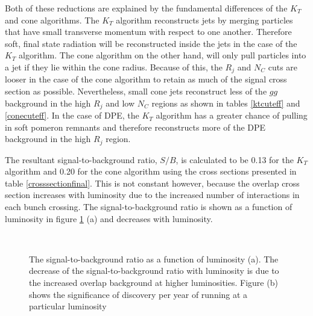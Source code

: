 Both of these reductions are explained by the fundamental differences of the $K_T$ and cone algorithms. The $K_T$ algorithm reconstructs jets by merging particles that have small transverse momentum with respect to one another. Therefore soft, final state radiation will be reconstructed inside the jets in the case of the $K_T$ algorithm. The cone algorithm on the other hand, will only pull particles into a jet if they lie within the cone radius. Because of this, the $R_j$ and $N_C$ cuts are looser in the case of the cone algorithm to retain as much of the signal cross section as possible. Nevertheless, small cone jets reconstruct less of the $gg$ background in the high $R_{j}$ and low $N_C$ regions as shown in tables \ref{ktcuteff} and \ref{conecuteff}. In the case of DPE, the $K_T$ algorithm has a greater chance of pulling in soft pomeron remnants and therefore reconstructs more of the DPE background in the high $R_j$ region.

The resultant signal-to-background ratio, $S/B$, is calculated to be 0.13 for the $K_T$ algorithm and 0.20 for the cone algorithm using the cross sections presented in table \ref{crosssectionfinal}. This is not constant however, because the overlap cross section increases with luminosity due to the increased number of interactions in each bunch crossing. The signal-to-background ratio is shown as a function of luminosity in figure \ref{StoBvsLumi} (a) and decreases with luminosity. 

\begin{figure}
\centering
\mbox{
	\quad
	}
\caption[The signal-to-background ratio and significance of the Standard Model Higgs boson as a function of luminosity]{The signal-to-background ratio as a function of luminosity (a). The decrease of the signal-to-background ratio with luminosity is due to the increased overlap background at higher luminosities. Figure (b) shows the significance of discovery per year of running at a particular luminosity\label{StoBvsLumi}}
\end{figure}

